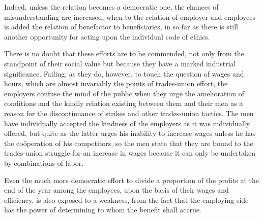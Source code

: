 \documentclass[]{article}
\begin{document}
\begin{sectionbody}
\addamsparagraph Indeed, unless the relation becomes a democratic one, the chances of
misunderstanding are increased, when to the relation of employer and
employees is added the relation of benefactor to beneficiaries, in so
far as there is still another opportunity for acting upon the individual
code of ethics.

\addamsparagraph There is no doubt that these efforts are to be commended, not only from
the standpoint of their social value but because they have a marked
industrial significance. Failing, as they do, however, to touch the
question of wages and hours, which are almost invariably the points of
trades-union effort, the employers confuse the mind of the public when
they urge the amelioration of conditions and the kindly relation
existing between them and their men as a reason for the discontinuance
of strikes and other trades-union tactics. The men have individually
accepted the kindness of the employers as it was individually offered,
but quite as the latter urges his inability to increase wages unless he
has the coöperation of his competitors, so the men state that they are
bound to the trades-union struggle for an increase in wages because it
can only be undertaken by combinations of labor.

\addamsparagraph Even the much more democratic effort to divide a proportion of the
profits at the end of the year among the employees, upon the basis of
their wages and efficiency, is also exposed to a weakness, from the fact
that the employing side has the power of determining to whom the benefit
shall accrue.


\end{sectionbody}
\end{document}
